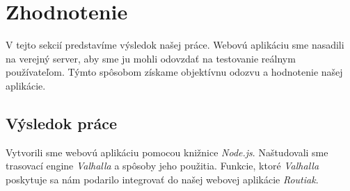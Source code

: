 \section{Zhodnotenie}
\indent \indent V tejto sekcií predstavíme výsledok našej práce. Webovú aplikáciu sme nasadili na verejný server, aby sme ju mohli odovzdať na testovanie reálnym používateľom. Týmto spôsobom získame objektívnu odozvu a hodnotenie našej aplikácie.
\subsection{Výsledok práce}

\indent \indent Vytvorili sme webovú aplikáciu pomocou knižnice \textit{Node.js}. Naštudovali sme trasovací engine \textit{Valhalla} a spôsoby jeho použitia. Funkcie, ktoré \textit{Valhalla} poskytuje sa nám podarilo integrovať do našej webovej aplikácie \textit{Routiak}. 

